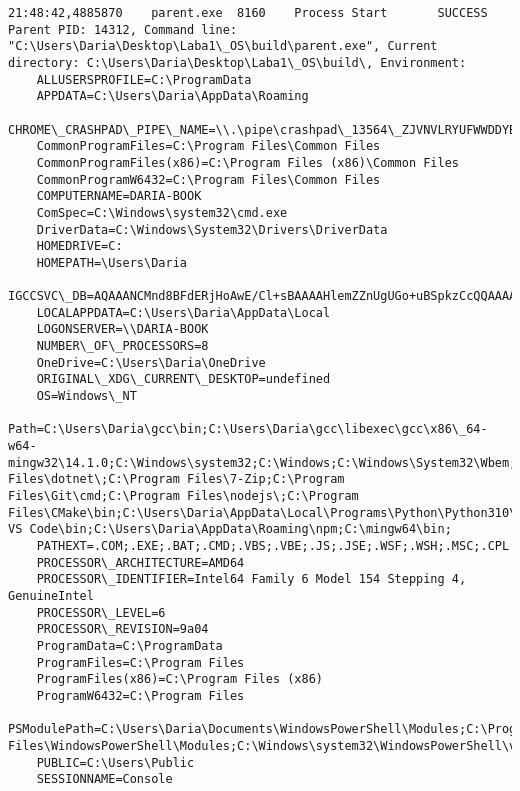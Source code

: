 \begin{verbatim}
21:48:42,4885870	parent.exe	8160	Process Start		SUCCESS	Parent PID: 14312, Command line: "C:\Users\Daria\Desktop\Laba1\_OS\build\parent.exe", Current directory: C:\Users\Daria\Desktop\Laba1\_OS\build\, Environment: 
	ALLUSERSPROFILE=C:\ProgramData
	APPDATA=C:\Users\Daria\AppData\Roaming
	CHROME\_CRASHPAD\_PIPE\_NAME=\\.\pipe\crashpad\_13564\_ZJVNVLRYUFWWDDYB
	CommonProgramFiles=C:\Program Files\Common Files
	CommonProgramFiles(x86)=C:\Program Files (x86)\Common Files
	CommonProgramW6432=C:\Program Files\Common Files
	COMPUTERNAME=DARIA-BOOK
	ComSpec=C:\Windows\system32\cmd.exe
	DriverData=C:\Windows\System32\Drivers\DriverData
	HOMEDRIVE=C:
	HOMEPATH=\Users\Daria
	IGCCSVC\_DB=AQAAANCMnd8BFdERjHoAwE/Cl+sBAAAAHlemZZnUgUGo+uBSpkzCcQQAAAACAAAAAAAQZgAAAAEAACAAAAAGheQ77iPmtc43Jm4IeZuELG1JqvCkCB+xVgAUP47whQAAAAAOgAAAAAIAACAAAABMj9+8TlLfQ9W9Iecl3nFZjp7KG8VmScGEjoZp5FsSDmAAAAAPLAvQM3/IJ389G+paEwtbgKxSYMa8X5GYroKqT700ZDqpz430Bq93FfKbqsoTUHnh0F7bZHZeJ/ctxClovmUxkEUOgew3boiOn40kkQia7HJCUhUDbNXJPKInj7Uv3J5AAAAAoAs5CSF+DXmMDAnu0Gbi6WrHyM/UqJP0Xl42SbQLNc03HBuPdccbOi5G9Z2SBbx5fFolIZlAdfwXXDcGn/LvDw==
	LOCALAPPDATA=C:\Users\Daria\AppData\Local
	LOGONSERVER=\\DARIA-BOOK
	NUMBER\_OF\_PROCESSORS=8
	OneDrive=C:\Users\Daria\OneDrive
	ORIGINAL\_XDG\_CURRENT\_DESKTOP=undefined
	OS=Windows\_NT
	Path=C:\Users\Daria\gcc\bin;C:\Users\Daria\gcc\libexec\gcc\x86\_64-w64-mingw32\14.1.0;C:\Windows\system32;C:\Windows;C:\Windows\System32\Wbem;C:\Windows\System32\WindowsPowerShell\v1.0\;C:\Windows\System32\OpenSSH\;C:\Program Files\dotnet\;C:\Program Files\7-Zip;C:\Program Files\Git\cmd;C:\Program Files\nodejs\;C:\Program Files\CMake\bin;C:\Users\Daria\AppData\Local\Programs\Python\Python310\Scripts\;C:\Users\Daria\AppData\Local\Programs\Python\Python310\;C:\Users\Daria\AppData\Local\Microsoft\WindowsApps;C:\Users\Daria\AppData\Local\Programs\Microsoft VS Code\bin;C:\Users\Daria\AppData\Roaming\npm;C:\mingw64\bin;
	PATHEXT=.COM;.EXE;.BAT;.CMD;.VBS;.VBE;.JS;.JSE;.WSF;.WSH;.MSC;.CPL
	PROCESSOR\_ARCHITECTURE=AMD64
	PROCESSOR\_IDENTIFIER=Intel64 Family 6 Model 154 Stepping 4, GenuineIntel
	PROCESSOR\_LEVEL=6
	PROCESSOR\_REVISION=9a04
	ProgramData=C:\ProgramData
	ProgramFiles=C:\Program Files
	ProgramFiles(x86)=C:\Program Files (x86)
	ProgramW6432=C:\Program Files
	PSModulePath=C:\Users\Daria\Documents\WindowsPowerShell\Modules;C:\Program Files\WindowsPowerShell\Modules;C:\Windows\system32\WindowsPowerShell\v1.0\Modules
	PUBLIC=C:\Users\Public
	SESSIONNAME=Console

\end{verbatim}
